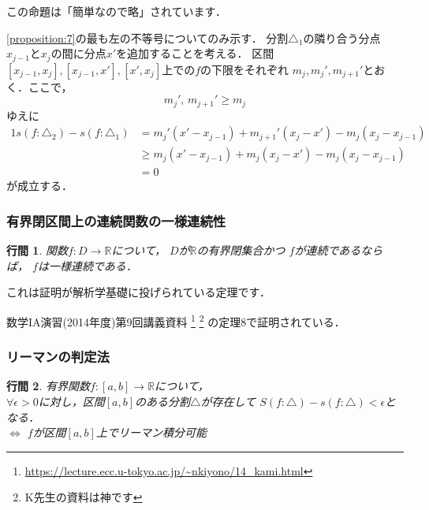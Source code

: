 \documentclass[uplatex]{jsarticle}
\makeatletter
\renewenvironment{proof}[1][\proofname]{\par
        \pushQED{\qed}
        \normalfont
        \topsep6\p@\@plus6\p@ \trivlist
        \item[\hskip\labelsep{\bfseries #1}\@addpunct{\bfseries}]\ignorespaces
    }{%
        \popQED\endtrivlist\@endpefalse
    }
\renewcommand{\proofname}{\underline{証明.}}
\newtheorem{proposition}{行間}
\makeatother
\begin{document}
この命題は「簡単なので略」されています．

\begin{proof}
    \cref{proposition:7}の最も左の不等号についてのみ示す．
    分割$\triangle_1$の隣り合う分点$x_{j-1}$と$x_{j}$の間に分点$x'$を追加することを考える．
    区間$[x_{j-1}, x_{j}], [x_{j-1}, x'], [x', x_j]$上での$f$の下限をそれぞれ
    $m_j, m_j', m_{j+1}'$とおく．ここで，
    \begin{equation}
        m_j',\, m_{j+1}' \geq m_j
    \end{equation}
    ゆえに
    \begin{alignat}{1}
        s(f:\triangle_2) - s(f:\triangle_1) &=
            m_j' (x' - x_{j-1}) + m_{j+1}' (x_j - x') - m_j (x_j - x_{j-1}) \\
        &\geq
            m_j (x' - x_{j-1}) + m_j (x_j - x') - m_j (x_j - x_{j-1}) \\
        &=
            0
    \end{alignat}
    が成立する．
\end{proof}

\subsubsection{有界閉区間上の連続関数の一様連続性}
\begin{screen}
    \begin{proposition}
        関数$f:D\rightarrow\mathbb{R}$について，
        $D$が$\mathbb{R}$の有界閉集合かつ
        $f$が連続であるならば，
        $f$は一様連続である．
    \end{proposition}
\end{screen}

これは証明が解析学基礎に投げられている定理です．

\begin{proof}
    数学IA演習(2014年度)第9回講義資料
    \footnote{\url{https://lecture.ecc.u-tokyo.ac.jp/~nkiyono/14_kami.html}}
    \footnote{K先生の資料は神です}
    の定理8で証明されている．
\end{proof}

\subsubsection{リーマンの判定法}
\begin{screen}
    \begin{proposition}
        \label{proposition:9}
        有界関数$f:[a,b]\rightarrow\mathbb{R}$について， \\
        $\forall \epsilon > 0$に対し，区間$[a,b]$のある分割$\triangle$が存在して
        $S(f: \triangle) - s(f: \triangle) < \epsilon$となる． \\
        \quad $\Longleftrightarrow$ $f$が区間$[a,b]$上でリーマン積分可能
    \end{proposition}
\end{screen}
\end{document}
